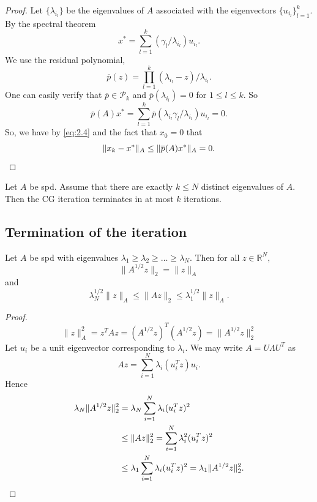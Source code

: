 \begin{proof}
  Let $\{\lambda_{i_l}\}$ be the eigenvalues of $A$ associated with
  the eigenvectors $\{u_{i_l}\}_{l=1}^k$. By the spectral theorem
  $$x^*=\sum\limits_{l=1}^k(\gamma_l/\lambda_{i_l})u_{i_l}.$$
  We use the residual polynomial,
  $$\overline{p}(z)=\prod\limits_{l=1}^k(\lambda_{i_l}-z)/\lambda_{i_l}.$$
  One can easily verify that $\overline{p}\in\mathcal{P}_k$ and
  $\overline{p}(\lambda_{i_l})=0$ for $1\leq l\leq k$. So
  $$\overline{p}(A)x^*=\sum\limits_{l=1}^k\overline{p}(\lambda_{i_l}\gamma_l/\lambda_{i_l})u_{i_l}=0.$$
  So, we have by \eqref{eq:2.4} and the fact that $x_0=0$ that
  \begin{equation*}
  \|x_k-x^*\|_A\leq \|\overline{p}(A)x^*\|_A=0.\qedhere
  \end{equation*}
\end{proof}
\begin{thm}
  Let $A$ be spd. Assume that there are exactly $k\leq N$ distinct
  eigenvalues of $A$. Then the CG iteration terminates in at most $k$ iterations.
\end{thm}

\subsection{Termination of the iteration}
\label{sec:2.3}

\begin{lemma}
  Let $A$ be spd with eigenvalues $\lambda_1\geq\lambda_2\geq
  \ldots\geq\lambda_N$. Then for all $z\in\mathbb{R}^N,$
  \begin{equation}
    \label{eq:2.10}
    \|A^{1/2}z\|_2=\|z\|_A
  \end{equation}
  and
  \begin{equation}
    \label{eq:2.11}
    \lambda_N^{1/2}\|z\|_A\leq \|Az\|_2 \leq \lambda_1^{1/2}\|z\|_A.
  \end{equation}
\end{lemma}

\begin{proof}
  $$\|z\|_A^2=z^TAz=(A^{1/2}z)^T(A^{1/2}z)=\|A^{1/2}z\|_2^2$$
  Let $u_i$ be a unit eigenvector corresponding to $\lambda_i$. We may
  write $A=U\Lambda U^T$
  as $$Az=\sum\limits_{i=1}^N\lambda_i(u_i^Tz)u_i.$$
  Hence
  \begin{equation*}
    \begin{split}
      \lambda_N\|A^{1/2}z\|_2^2 &=
      \lambda_N\sum\limits_{i=1}^N\lambda_i(u_i^Tz)^2 \\
      &\leq \|Az\|_2^2 = \sum_{i=1}^N\lambda_i^2(u_i^Tz)^2 \\
      &\leq \lambda_1\sum\limits_{i=1}^N\lambda_i(u_i^Tz)^2 =
      \lambda_1\|A^{1/2}z\|_2^2 .  \qedhere 
    \end{split}
  \end{equation*}
\end{proof}


